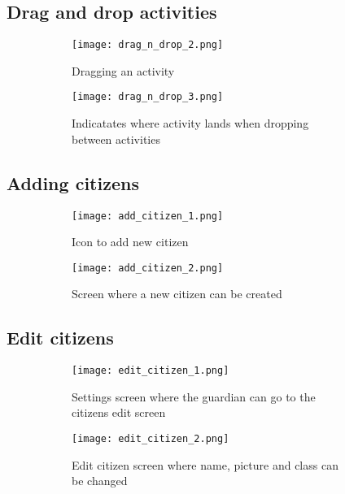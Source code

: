 \subsection{Drag and drop activities}

\begin{figure}[H]
    \begin{subfigure}{0.5\textwidth}
    \texttt{[image: drag\_n\_drop\_2.png]}
    \caption{Dragging an activity}
    \label{subfig:drag_n_drop_2}
    \end{subfigure}
    \begin{subfigure}{0.5\textwidth}
        \texttt{[image: drag\_n\_drop\_3.png]}
    \caption{Indicatates where activity lands when dropping between activities}
    \label{subfig:drag_n_drop_3}
    \end{subfigure} 
    \caption{}
    \label{fig:drag_n_drop}
\end{figure}

\subsection{Adding citizens}

\begin{figure}[H]
    \begin{subfigure}{0.5\textwidth}
    \texttt{[image: add\_citizen\_1.png]}
    \caption{Icon to add new citizen}
    \label{subfig:add_citizen_1}
    \end{subfigure}
    \begin{subfigure}{0.5\textwidth}
        \texttt{[image: add\_citizen\_2.png]}
    \caption{Screen where a new citizen can be created}
    \label{subfig:add_citizen_2}
    \end{subfigure} 
    \caption{}
    \label{fig:add_citizen}
\end{figure}

\subsection{Edit citizens}

\begin{figure}[H]
    \begin{subfigure}{0.5\textwidth}
    \texttt{[image: edit\_citizen\_1.png]}
    \caption{Settings screen where the guardian can go to the citizens edit screen}
    \label{subfig:edit_citizen_1}
    \end{subfigure}
    \begin{subfigure}{0.5\textwidth}
        \texttt{[image: edit\_citizen\_2.png]}
    \caption{Edit citizen screen where name, picture and class can be changed}
    \label{subfig:edit_citizen_2}
    \end{subfigure} 
    \caption{}
    \label{fig:edit_citizen}
\end{figure}

